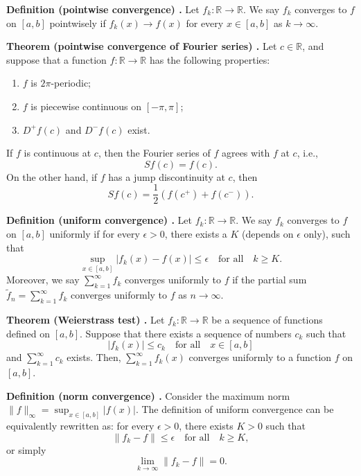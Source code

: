 \begin{shaded}
\textbf{Definition (pointwise convergence) \cite{math2111_notes}.} Let $f_k : \mathbb{R} \to \mathbb{R}$. We say $f_k$ converges to $f$ on $[a, b]$ pointwisely if $f_k(x) \to f(x)$ for every $x \in [a, b]$ as $k \to \infty$.
\end{shaded}

\begin{shaded}
\textbf{Theorem (pointwise convergence of Fourier series) \cite{math2111_notes}.} Let $c \in \mathbb{R}$, and suppose that a function $f : \mathbb{R} \to \mathbb{R}$ has the following properties:
\begin{enumerate}
	\item $f$ is $2 \pi$-periodic;
	\item $f$ is piecewise continuous on $[-\pi, \pi]$;
	\item $D^+ f(c)$ and $D^- f(c)$ exist.
\end{enumerate}
If $f$ is continuous at $c$, then the Fourier series of $f$ agrees with $f$ at $c$, i.e.,
$$ S f(c) = f(c) . $$
On the other hand, if $f$ has a jump discontinuity at $c$, then
$$ S f(c) = \frac{1}{2} \left( f(c^+) + f(c^-) \right) . $$
\end{shaded}

\begin{shaded}
\textbf{Definition (uniform convergence) \cite{math2111_notes}.} Let $f_k : \mathbb{R} \to \mathbb{R}$. We say $f_k$ converges to $f$ on $[a, b]$ uniformly if for every $\epsilon > 0$, there exists a $K$ (depends on $\epsilon$ only), such that
$$ \sup_{x \in [a, b]} | f_k(x) - f(x) | \leq \epsilon \quad \text{for all} \quad k \geq K . $$
Moreover, we say $\sum_{k = 1}^{\infty} f_k$ converges uniformly to $f$ if the partial sum $\tilde{f}_n = \sum_{k = 1}^{\infty} f_k$ converges uniformly to $f$ as $n \to \infty$.
\end{shaded}

\begin{shaded}
\textbf{Theorem (Weierstrass test) \cite{math2111_notes}.} Let $f_k : \mathbb{R} \to \mathbb{R}$ be a sequence of functions defined on $[a, b]$. Suppose that there exists a sequence of numbers $c_k$ such that
$$ |f_k(x)| \leq c_k \quad \text{for all} \quad x \in [a, b] $$
and $\sum_{k = 1}^\infty c_k$ exists. Then, $\sum_{k = 1}^\infty f_k(x)$ converges uniformly to a function $f$ on $[a, b]$.
\end{shaded}

\begin{shaded}
\textbf{Definition (norm convergence) \cite{math2111_notes}.} Consider the maximum norm $\lVert f \rVert_\infty = \sup_{x \in [a, b]} |f(x)|$. The definition of uniform convergence can be equivalently rewritten as: for every $\epsilon > 0$, there exists $K > 0$ such that
$$ \lVert f_k - f \rVert \leq \epsilon \quad \text{for all} \quad k \geq K , $$
or simply
$$ \lim_{k \to \infty} \lVert f_k - f \rVert = 0 . $$
\end{shaded}

